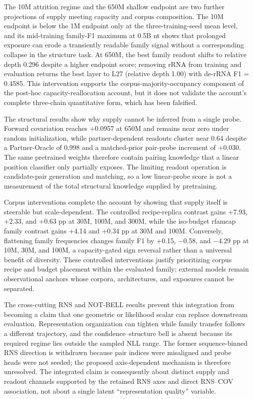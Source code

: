 The 10M attrition regime and the 650M shallow endpoint are two further projections of supply meeting capacity and corpus composition. The 10M endpoint is below the 1M endpoint only at the three-training-seed mean level, and its mid-training family-F1 maximum at 0.5B nt shows that prolonged exposure can erode a transiently readable family signal without a corresponding collapse in the structure task. At 650M, the best family readout shifts to relative depth 0.296 despite a higher endpoint score; removing rRNA from training and evaluation returns the best layer to L27 (relative depth 1.00) with de-rRNA F1 = 0.4585. This intervention supports the corpus-majority-occupancy component of the post-hoc capacity-reallocation account, but it does not validate the account's complete three-chain quantitative form, which has been falsified.

The structural results show why supply cannot be inferred from a single probe. Forward covariation reaches +0.0957 at 650M and remains near zero under random initialization, while partner-dependent readouts cluster near 0.64 despite a Partner-Oracle of 0.998 and a matched-prior pair-probe increment of +0.030. The same pretrained weights therefore contain pairing knowledge that a linear position classifier only partially exposes. The limiting readout operation is candidate-pair generation and matching, so a low linear-probe score is not a measurement of the total structural knowledge supplied by pretraining.

Corpus interventions complete the account by showing that supply itself is steerable but scale-dependent. The controlled recipe-replica contrast gains +7.93, +2.33, and +0.63 pp at 30M, 100M, and 300M, while the iso-budget rfamcap family contrast gains +4.14 and +0.34 pp at 30M and 100M. Conversely, flattening family frequencies changes family F1 by +0.15, \(-\)0.58, and \(-\)4.29 pp at 10M, 30M, and 100M, a capacity-gated sign reversal rather than a universal benefit of diversity. These controlled interventions justify prioritizing corpus recipe and budget placement within the evaluated family; external models remain observational anchors whose corpora, architectures, and exposures cannot be separated.

The cross-cutting RNS and NOT-BELL results prevent this integration from becoming a claim that one geometric or likelihood scalar can replace downstream evaluation. Representation organization can tighten while family transfer follows a different trajectory, and the confidence--structure bell is absent because its required regime lies outside the sampled NLL range. The former sequence-binned RNS direction is withdrawn because pair indices were misaligned and probe heads were not seeded; the proposed axis-dependent mechanism is therefore unresolved. The integrated claim is consequently about distinct supply and readout channels supported by the retained RNS axes and direct RNS--COV association, not about a single latent ``representation quality'' variable.


